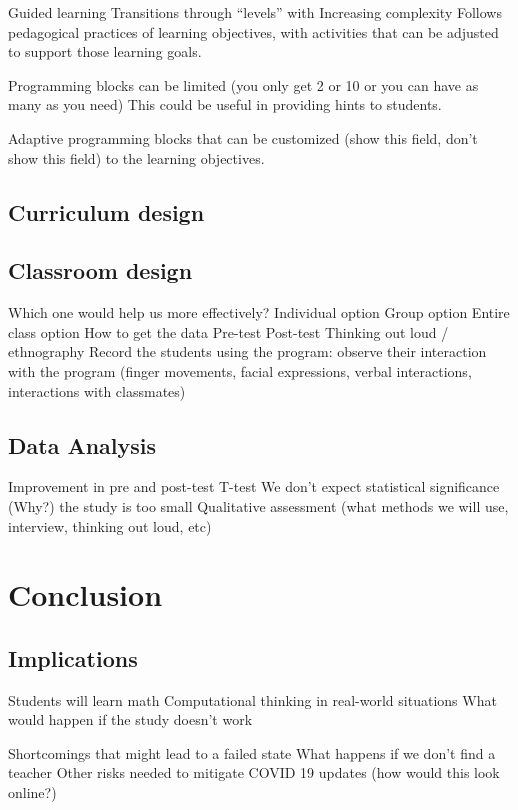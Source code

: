 \documentclass[12pt]{extarticle}
\begin{document}
Guided learning
Transitions through “levels” with Increasing complexity
Follows pedagogical practices of learning objectives,  with activities that can be adjusted to support those learning goals.

Programming blocks can be limited (you only get 2 or 10 or you can have as many as you need) This could be useful in providing hints to students.

Adaptive programming blocks that can be customized (show this field, don’t show this field) to the learning objectives.

\subsection*{Curriculum design}
\subsection*{Classroom design}
Which one would help us more effectively?
Individual option
Group option
Entire class option
How to get the data
	Pre-test
	Post-test
	Thinking out loud / ethnography
		Record the students using the program: observe their interaction with the program (finger movements, facial expressions, verbal interactions, interactions with classmates)
\subsection*{Data Analysis}
Improvement in pre and post-test
T-test
We don’t expect statistical significance (Why?) the study is too small 
Qualitative assessment (what methods we will use, interview, thinking out loud, etc)
\section*{Conclusion}
\subsection*{Implications}
Students will learn math
Computational thinking in real-world situations
What would happen if the study doesn’t work

Shortcomings that might lead to a failed state
What happens if we don’t find a teacher
Other risks needed to mitigate
COVID 19 updates (how would this look online?)



\end{document}
